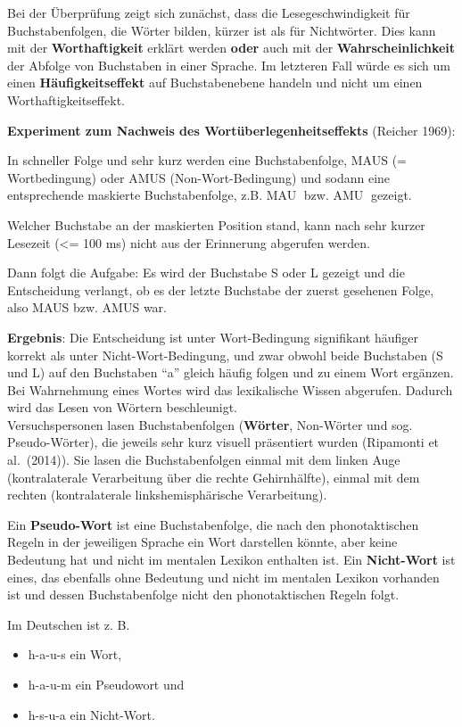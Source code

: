 \documentclass[
  letterpaper,
]{scrbook}
\begin{document}
Bei der Überprüfung zeigt sich zunächst, dass die Lesegeschwindigkeit
für Buchstabenfolgen, die Wörter bilden, kürzer ist als für Nichtwörter.
Dies kann mit der \textbf{Worthaftigkeit} erklärt werden \textbf{oder}
auch mit der \textbf{Wahrscheinlichkeit} der Abfolge von Buchstaben in
einer Sprache. Im letzteren Fall würde es sich um einen
\textbf{Häufigkeitseffekt} auf Buchstabenebene handeln und nicht um
einen Worthaftigkeitseffekt.

\textbf{Experiment zum Nachweis des Wortüberlegenheitseffekts} (Reicher
1969):

In schneller Folge und sehr kurz werden eine Buchstabenfolge, MAUS (=
Wortbedingung) oder AMUS (Non-Wort-Bedingung) und sodann eine
entsprechende maskierte Buchstabenfolge, z.B. MAU bzw. AMU gezeigt.

Welcher Buchstabe an der maskierten Position stand, kann nach sehr
kurzer Lesezeit (\textless= 100 ms) nicht aus der Erinnerung abgerufen
werden.

Dann folgt die Aufgabe: Es wird der Buchstabe S oder L gezeigt und die
Entscheidung verlangt, ob es der letzte Buchstabe der zuerst gesehenen
Folge, also MAUS bzw. AMUS war.

\textbf{Ergebnis}: Die Entscheidung ist unter Wort-Bedingung signifikant
häufiger korrekt als unter Nicht-Wort-Bedingung, und zwar obwohl beide
Buchstaben (S und L) auf den Buchstaben ``a'' gleich häufig folgen und
zu einem Wort ergänzen. Bei Wahrnehmung eines Wortes wird das
lexikalische Wissen abgerufen. Dadurch wird das Lesen von Wörtern
beschleunigt.\\

Versuchspersonen lasen Buchstabenfolgen (\textbf{Wörter}, Non-Wörter und
sog. Pseudo-Wörter), die jeweils sehr kurz visuell präsentiert wurden
(Ripamonti et al.~(2014)). Sie lasen die Buchstabenfolgen einmal mit dem
linken Auge (kontralaterale Verarbeitung über die rechte Gehirnhälfte),
einmal mit dem rechten (kontralaterale linkshemisphärische
Verarbeitung).

Ein \textbf{Pseudo-Wort} ist eine Buchstabenfolge, die nach den
phonotaktischen Regeln in der jeweiligen Sprache ein Wort darstellen
könnte, aber keine Bedeutung hat und nicht im mentalen Lexikon enthalten
ist. Ein \textbf{Nicht-Wort} ist eines, das ebenfalls ohne Bedeutung und
nicht im mentalen Lexikon vorhanden ist und dessen Buchstabenfolge nicht
den phonotaktischen Regeln folgt.

Im Deutschen ist z. B.

\begin{itemize}
\item
  h-a-u-s ein Wort,
\item
  h-a-u-m ein Pseudowort und
\item
  h-s-u-a ein Nicht-Wort.
\end{itemize}
\end{document}

